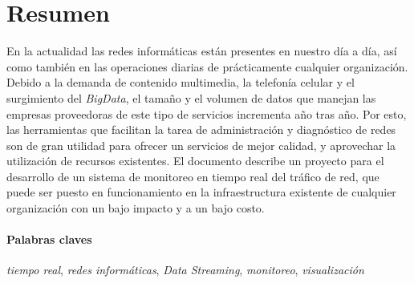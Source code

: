 \section*{Resumen}

En la actualidad las redes informáticas están presentes en nuestro día a día, así como también en las operaciones diarias de prácticamente cualquier organización. Debido a la demanda de contenido multimedia, la telefonía celular y el surgimiento del \textit{BigData}, el tamaño y el volumen de datos que manejan las empresas proveedoras de este tipo de servicios incrementa año tras año. Por esto, las herramientas que facilitan la tarea de administración y diagnóstico de redes son de gran utilidad para ofrecer un servicios de mejor calidad, y aprovechar la utilización de recursos existentes.
El documento describe un proyecto para el desarrollo de un sistema de monitoreo en tiempo real del tráfico de red, que puede ser puesto en funcionamiento en la infraestructura existente de cualquier organización con un bajo impacto y a un bajo costo.

\paragraph{Palabras claves} \textit{tiempo real}, \textit{redes informáticas}, \textit{Data Streaming}, \textit{monitoreo}, \textit{visualización}

\newpage